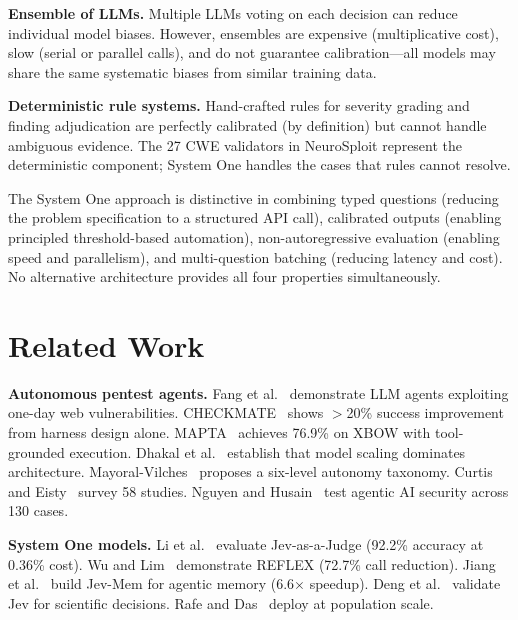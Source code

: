 \documentclass[conference]{IEEEtran}
\begin{document}
\textbf{Ensemble of LLMs.} Multiple LLMs voting on each decision can reduce individual model biases. However, ensembles are expensive (multiplicative cost), slow (serial or parallel calls), and do not guarantee calibration---all models may share the same systematic biases from similar training data.

\textbf{Deterministic rule systems.} Hand-crafted rules for severity grading and finding adjudication are perfectly calibrated (by definition) but cannot handle ambiguous evidence. The 27 CWE validators in NeuroSploit represent the deterministic component; System One handles the cases that rules cannot resolve.

The System One approach is distinctive in combining typed questions (reducing the problem specification to a structured API call), calibrated outputs (enabling principled threshold-based automation), non-autoregressive evaluation (enabling speed and parallelism), and multi-question batching (reducing latency and cost). No alternative architecture provides all four properties simultaneously.

\section{Related Work}\label{sec:related}

\textbf{Autonomous pentest agents.} Fang et al.~\cite{fang2024oneday} demonstrate LLM agents exploiting one-day web vulnerabilities. CHECKMATE~\cite{wang2025checkmate} shows $>$20\% success improvement from harness design alone. MAPTA~\cite{david2025mapta} achieves 76.9\% on XBOW with tool-grounded execution. Dhakal et al.~\cite{dhakal2026baselines} establish that model scaling dominates architecture. Mayoral-Vilches~\cite{mayoral2025gap} proposes a six-level autonomy taxonomy. Curtis and Eisty~\cite{curtis2025role} survey 58 studies. Nguyen and Husain~\cite{nguyen2025agenticpentest} test agentic AI security across 130 cases.

\textbf{System One models.} Li et al.~\cite{li2026jevasjudge} evaluate Jev-as-a-Judge (92.2\% accuracy at 0.36\% cost). Wu and Lim~\cite{wu2026reflex} demonstrate REFLEX (72.7\% call reduction). Jiang et al.~\cite{jiang2026jevmem} build Jev-Mem for agentic memory (6.6$\times$ speedup). Deng et al.~\cite{deng2026jevscience} validate Jev for scientific decisions. Rafe and Das~\cite{rafe2026crash} deploy at population scale.
\end{document}
